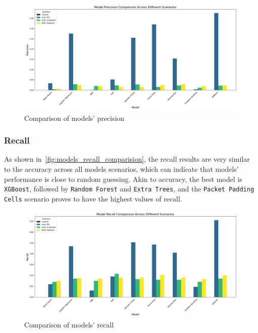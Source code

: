 \begin{figure}[!h]
  \centering
  \includegraphics[width=\textwidth]{Chapters/Figures/Plots/obs_Precision_comparison.png}
  \caption{Comparison of models' precision}\label{fig:models_precision_comparision}
\end{figure}

\subsubsection{Recall}

As shown in~\autoref{fig:models_recall_comparision}, the recall results are very similar to the accuracy across all models scenarios, which can indicate that models' performance is close to random guessing. Akin to accuracy, the best model is \texttt{XGBoost}, followed by \texttt{Random Forest} and \texttt{Extra Trees}, and the \texttt{Packet Padding Cells} scenario proves to have the highest values of recall.


\begin{figure}[!h]
  \centering
  \includegraphics[width=\textwidth]{Chapters/Figures/Plots/obs_Recall_comparison.png}
  \caption{Comparison of models' recall}\label{fig:models_recall_comparision}
\end{figure}


